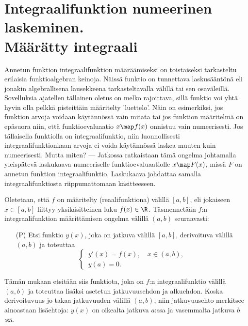 \section{Integraalifunktion numeerinen laskeminen. \\ Määrätty integraali}
\label{määrätty integraali}
\alku

Annetun funktion integraalifunktion määräämiseksi on toistaiseksi tarkasteltu erilaisia
funktioalgebran keinoja. Näissä funktio on tunnettava laskusääntönä eli jonakin
algebrallisena lausekkeena tarkasteltavalla välillä tai sen osaväleillä. Sovelluksia
ajatellen tällainen oletus on melko rajoittava, sillä funktio voi yhtä hyvin olla pelkkä
pisteittäin määritelty 'luettelo'. Näin on esimerkiksi, jos funktion arvoja voidaan
käytännössä vain mitata tai jos funktion määritelmä on epäsuora niin, että funktioevaluaatio
$x \map f(x)$ onnistuu vain numeerisesti. Jos tällaisella funktiolla on integraalifunktio,
niin luonnollisesti integraalifunktionkaan arvoja ei voida käytännössä laskea muuten kuin
numeerisesti. Mutta miten? --- Jatkossa ratkaistaan tämä ongelma johtamalla yleispätevä
laskukaava numeeriselle funktioevaluaatiolle $x \map F(x)$, missä $F$ on annetun funktion
integraalifunktio. Laskukaava johdattaa samalla integraalifunktiosta riippumattomaan
 käsitteeseen.

Oletetaan, että $f$ on määritelty (reaalifunktiona) välillä $[a,b]$, eli jokaiseen
$x\in[a,b]$ liittyy yksikäsitteinen luku $f(x)\in\R$. Täsmennetään $f$:n
integraalifunktion määrittämisen ongelma välillä $(a,b)$ seuraavasti:
\begin{itemize}
\item[(P)] Etsi funktio $y(x)$, joka on jatkuva välillä $[a,b]$, derivoituva välillä $(a,b)$
ja toteuttaa
\[
\begin{cases}
\,y'(x)=f(x),\quad x\in (a,b), \\
\,y(a)=0.
\end{cases}
\]
\end{itemize}
Tämän mukaan etsitään siis funktiota, joka on $f$:n integraalifunktio välillä $(a,b)$ ja
toteuttaa lisäksi asetetun jatkuvuusehdon ja alkuehdon. Koska derivoituvuus jo takaa
jatkuvuuden välillä $(a,b)$, niin jatkuvuusehto merkitsee ainoastaan lisäehtoja:
$y(x)$ on oikealta jatkuva $a$:ssa ja vasemmalta jatkuva $b$:sä. 

